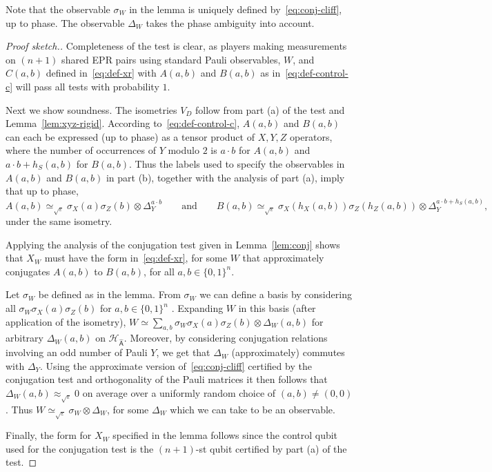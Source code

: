 \documentclass[11pt]{article}
\theoremstyle{remark}
\theoremstyle{definition}
\newcommand{\reg}[1]{{\textsf{#1}}}
\newcommand{\mH}{\mathcal{H}}
\newcommand{\eps}{\varepsilon}
\begin{document}
Note that the observable $\sigma_W$ in the lemma is uniquely defined by~\eqref{eq:conj-cliff}, up to phase. The observable $\Delta_W$ takes the phase ambiguity into account.

\begin{proof}[Proof sketch.]
 Completeness of the test is clear, as players making measurements on $(n+1)$ shared EPR pairs using standard Pauli observables, $W$, and $C(a,b)$ defined in~\eqref{eq:def-xr} with $A(a,b)$ and $B(a,b)$ as in~\eqref{eq:def-control-c} will pass all tests with probability $1$. 

Next we show soundness. The isometries $V_D$ follow from part (a) of the test and Lemma~\ref{lem:xyz-rigid}.
According to~\eqref{eq:def-control-c}, $A(a,b)$ and $B(a,b)$ can each be expressed (up to phase) as a tensor product of $X,Y,Z$ operators, where the number of occurrences of $Y$ modulo $2$ is $a\cdot b$ for $A(a,b)$ and $a\cdot b + h_S(a,b)$ for $B(a,b)$. Thus the labels used to specify the observables in $A(a,b)$ and $B(a,b)$ in part (b), together with the analysis of part (a), imply that up to phase, 
$$A(a,b) \simeq_{\sqrt{\eps}} \sigma_X(a)\sigma_Z(b) \otimes \Delta_Y^{a\cdot b}\qquad\text{and}\qquad B(a,b) \simeq_{\sqrt{\eps}} \sigma_X(h_X(a,b)) \sigma_Z(h_Z(a,b)) \otimes \Delta_Y^{a\cdot b + h_S(a,b)},$$
under the same isometry. 

Applying the analysis of the conjugation test given in Lemma~\ref{lem:conj} shows that $X_W$ must have the form in~\eqref{eq:def-xr}, for some $W$ that approximately conjugates $A(a,b)$ to $B(a,b)$, for all $a,b\in\{0,1\}^n$.

Let $\sigma_W$ be defined as in the lemma. From $\sigma_W$ we can define a basis by considering all $\sigma_W \sigma_X(a)\sigma_Z(b)$ for $a,b\in\{0,1\}^n$ . Expanding $W$ in this basis (after application of the isometry), $W \simeq \sum_{a,b} \sigma_W \sigma_X(a)\sigma_Z(b)\otimes \Delta_W(a,b)$ for arbitrary $\Delta_W(a,b)$ on $\mH_{\hat{\reg{A}}}$. Moreover, by considering conjugation relations involving an odd number of Pauli $Y$, we get that $\Delta_W$ (approximately) commutes with $\Delta_Y$. 
Using the approximate version of~\eqref{eq:conj-cliff} certified by the conjugation test and orthogonality of the Pauli matrices it then follows that $\Delta_W(a,b) \approx_{\sqrt{\eps}} 0$ on average over a uniformly random choice of $(a,b)\neq (0,0)$. Thus $W \simeq_{\sqrt{\eps}} \sigma_W \otimes \Delta_W$, for some $\Delta_W$ which we can take to be an observable. 

Finally,  the form for $X_W$ specified in the lemma follows since the control qubit used for the conjugation test is the $(n+1)$-st qubit certified by part (a) of the test.
\end{proof}
\end{document}
